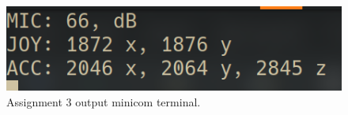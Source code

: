 \begin{figure}[h]
    \centering
    \includegraphics[width=\columnwidth]{images/4.3out.png}
    \caption{Assignment 3 output minicom terminal.}
    \label{fig:output_terminal}
\end{figure}